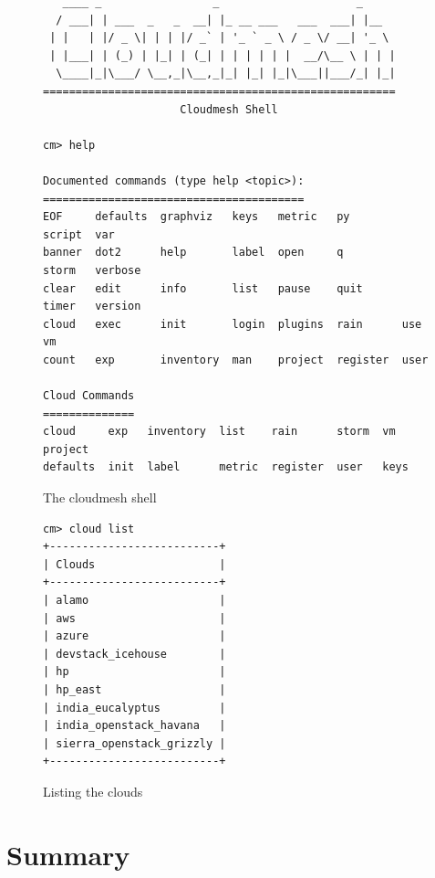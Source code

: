 \documentclass[graybox]{svmult}
\begin{document}
\begin{figure}[htb]
\begingroup
    \fontsize{6pt}{6pt}\selectfont
\begin{verbatim}
   ____ _                 _                     _     
  / ___| | ___  _   _  __| |_ __ ___   ___  ___| |__  
 | |   | |/ _ \| | | |/ _` | '_ ` _ \ / _ \/ __| '_ \ 
 | |___| | (_) | |_| | (_| | | | | | |  __/\__ \ | | |
  \____|_|\___/ \__,_|\__,_|_| |_| |_|\___||___/_| |_|
======================================================
                     Cloudmesh Shell

cm> help

Documented commands (type help <topic>):
========================================
EOF     defaults  graphviz   keys   metric   py        script  var    
banner  dot2      help       label  open     q         storm   verbose
clear   edit      info       list   pause    quit      timer   version
cloud   exec      init       login  plugins  rain      use     vm     
count   exp       inventory  man    project  register  user  

Cloud Commands
==============
cloud     exp   inventory  list    rain      storm  vm    project
defaults  init  label      metric  register  user   keys
\end{verbatim}
\endgroup
\caption{The cloudmesh shell}
\label{F:shell}
\end{figure}

\begin{figure}[htb]
\begingroup
    \fontsize{6pt}{6pt}\selectfont
\begin{verbatim}
cm> cloud list
+--------------------------+
| Clouds                   |
+--------------------------+
| alamo                    |
| aws                      |
| azure                    |
| devstack_icehouse        |
| hp                       |
| hp_east                  |
| india_eucalyptus         |
| india_openstack_havana   |
| sierra_openstack_grizzly |
+--------------------------+
\end{verbatim}
\endgroup
\caption{Listing the clouds}
\label{F:shell-clouds}
\end{figure}

\afterpage{\clearpage}


\section{Summary}\label{S:summary}
\end{document}
